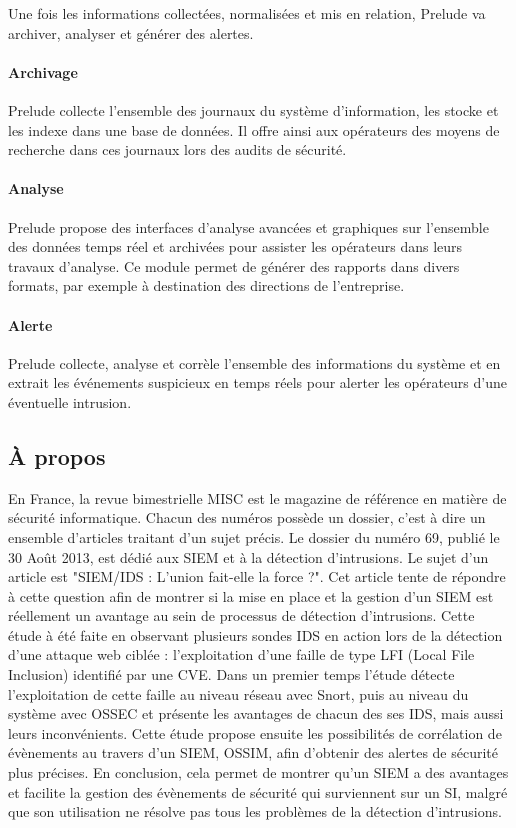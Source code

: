 \documentclass[a4paper,11pt,french]{article}
\begin{document}
Une fois les informations collectées, normalisées et mis en relation, Prelude va archiver, analyser et générer des alertes.
\paragraph{Archivage} Prelude collecte l'ensemble des journaux du système d'information, les stocke et les indexe dans une base de données. Il offre ainsi aux opérateurs des moyens de recherche dans ces journaux lors des audits de sécurité.

\paragraph{Analyse} Prelude propose des interfaces d'analyse avancées et graphiques sur l'ensemble des données temps réel et archivées pour assister les opérateurs dans leurs travaux d'analyse. Ce module permet de générer des rapports dans divers formats, par exemple à destination des directions de l'entreprise.

\paragraph{Alerte} Prelude collecte, analyse et corrèle l'ensemble des informations du système et en extrait les événements suspicieux en temps réels pour alerter les opérateurs d'une éventuelle intrusion.

\subsection{À propos}
En France, la revue bimestrielle MISC est le magazine de référence en matière de sécurité informatique. Chacun des numéros possède un dossier, c’est à dire un ensemble d’articles traitant d’un sujet précis. Le dossier du numéro 69, publié le 30 Août 2013, est dédié aux SIEM et à la détection d’intrusions. Le sujet d’un article est "SIEM/IDS : L’union fait-elle la force ?". Cet article tente de répondre à cette question afin de montrer si la mise en place et la gestion d’un SIEM est réellement un avantage au sein de processus de détection d’intrusions. Cette étude à été faite en observant plusieurs sondes IDS en action lors de la détection d’une attaque web ciblée : l’exploitation d’une faille de type LFI (Local File Inclusion) identifié par une CVE. Dans un premier temps l’étude détecte l’exploitation de cette faille au niveau réseau avec Snort, puis au niveau du système avec OSSEC et présente les avantages de chacun des ses IDS, mais aussi leurs inconvénients. Cette étude propose ensuite les possibilités de corrélation de évènements au travers d’un SIEM, OSSIM, afin d’obtenir des alertes de sécurité plus précises. En conclusion, cela permet de montrer qu’un SIEM a des avantages et facilite la gestion des évènements de sécurité qui surviennent sur un SI, malgré que son utilisation ne résolve pas tous les problèmes de la détection d’intrusions.
\end{document}
